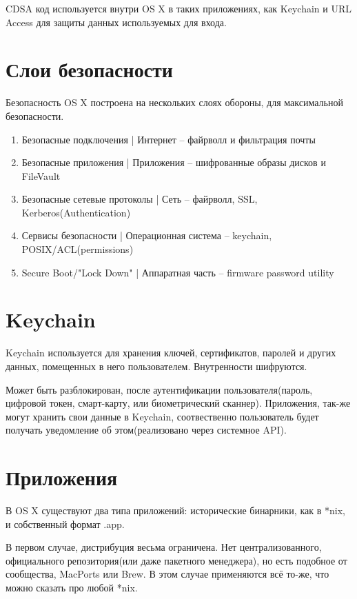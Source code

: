 \documentclass[12pt, a4paper]{article}
\begin{document}
CDSA код используется внутри OS X в таких приложениях, как Keychain и URL Access для защиты данных используемых для входа.

\section{Слои безопасности}

Безопасность OS X построена на нескольких слоях обороны, для максимальной безопасности.

\begin{enumerate}
  \item{Безопасные подключения | Интернет -- файрволл и фильтрация почты}
  \item{Безопасные приложения | Приложения -- шифрованные образы дисков и FileVault}
  \item{Безопасные сетевые протоколы | Сеть -- файрволл, SSL, Kerberos(Authentication)}
  \item{Сервисы безопасности | Операционная система -- keychain, POSIX/ACL(permissions)}
  \item{Secure Boot/"Lock Down" | Аппаратная часть -- firmware password utility}
\end{enumerate}

\section{Keychain}

Keychain используется для хранения ключей, сертификатов, паролей и других данных, помещенных в него пользователем. Внутренности шифруются.

Может быть разблокирован, после аутентификации пользователя(пароль, цифровой токен, смарт-карту, или биометрический сканнер). Приложения, так-же могут хранить свои данные в Keychain, соотвественно пользователь будет получать уведомление об этом(реализовано через системное API).

\section{Приложения}

В OS X существуют два типа приложений: исторические бинарники, как в *nix, и собственный формат .app.

В первом случае, дистрибуция весьма ограничена. Нет централизованного, официального репозитория(или даже пакетного менеджера), но есть подобное от сообщества, MacPorts или Brew. В этом случае применяются всё то-же, что можно сказать про любой *nix.
\end{document}
